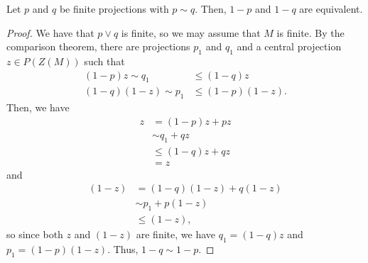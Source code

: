 \documentclass[10pt]{mypackage}
\begin{document}
\begin{proposition}
  Let $p$ and $q$ be finite projections with $p\sim q$. Then, $1-p$ and $1-q$ are equivalent.
\end{proposition}
\begin{proof}
  We have that $p\vee q$ is finite, so we may assume that $M$ is finite. By the comparison theorem, there are projections $p_1$ and $q_1$ and a central projection $z\in P(Z(M))$ such that
  \begin{align*}
    \left( 1-p \right)z \sim q_1 &\leq \left( 1-q \right)z\\
    \left( 1-q \right)\left( 1-z \right)\sim p_1 &\leq \left( 1-p \right)\left( 1-z \right).
  \end{align*}
  Then, we have
  \begin{align*}
    z &= \left( 1-p \right)z + pz\\
      &\sim q_1 + qz\\
      &\leq \left( 1-q \right)z + qz\\
      &= z
  \end{align*}
  and
  \begin{align*}
    \left( 1-z \right) &= \left( 1-q \right)\left( 1-z \right) + q\left( 1-z \right)\\
                       &\sim p_1 + p\left( 1-z \right)\\
                       &\leq \left( 1-z \right),
  \end{align*}
  so since both $z$ and $\left( 1-z \right)$ are finite, we have $q_1 = \left( 1-q \right)z$ and $p_1 = \left( 1-p \right)\left( 1-z \right)$. Thus, $1-q\sim 1-p$.
\end{proof}
\end{document}
